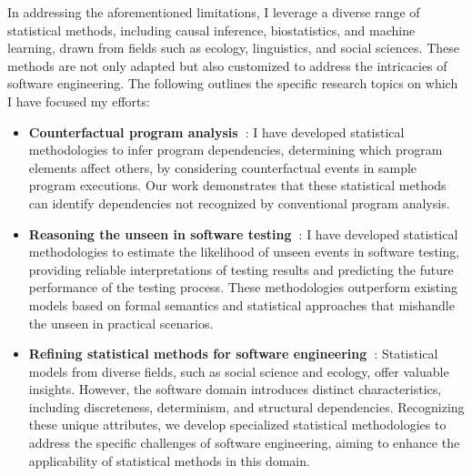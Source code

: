 \documentclass{article}
\begin{document}

In addressing the aforementioned limitations, I leverage a diverse range of statistical methods, including causal inference, biostatistics, and machine learning, drawn from fields such as ecology, linguistics, and social sciences. These methods are not only adapted but also customized to address the intricacies of software engineering. The following outlines the specific research topics on which I have focused my efforts:

\begin{itemize}[leftmargin=*]
  \item \textbf{Counterfactual program analysis~\cite[Section~\ref{sec:dependency}]{leeObservationbasedApproximateDependency2021,leeCausalProgramDependence2025a,leeEvaluatingLexicalApproximation2020,ohEffectivelySamplingHigher2021}}:
        I have developed statistical methodologies to infer program dependencies, determining which program elements affect others, by considering counterfactual events in sample program executions. Our work demonstrates that these statistical methods can identify dependencies not recognized by conventional program analysis.
  \item \textbf{Reasoning the unseen in software testing~\cite[Section~\ref{sec:unseen}]{leeStatisticalReachabilityAnalysis2023,leeStructureawareResidualRisk2025,leeAccountingMissingEvents2025,liyanageExtrapolatingCoverageRate2024}}:
        I have developed statistical methodologies to estimate the likelihood of unseen events in software testing, providing reliable interpretations of testing results and predicting the future performance of the testing process. These methodologies outperform existing models based on formal semantics and statistical approaches that mishandle the unseen in practical scenarios.
  \item \textbf{Refining statistical methods for software engineering~\cite[Section~\ref{sec:refine}]{leeCausalProgramDependence2025a,leeStatisticalReachabilityAnalysis2023,leeHowMuchUnseen2024,leeStructureawareResidualRisk2025}}: 
        Statistical models from diverse fields, such as social science and ecology, offer valuable insights. However, the software domain introduces distinct characteristics, including discreteness, determinism, and structural dependencies. Recognizing these unique attributes, we develop specialized statistical methodologies to address the specific challenges of software engineering, aiming to enhance the applicability of statistical methods in this domain.
\end{itemize}
\end{document}
